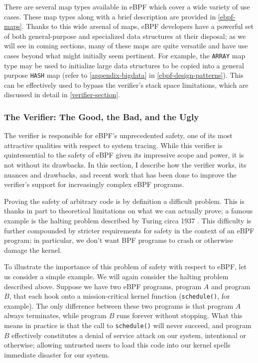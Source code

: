 \documentclass[
  12pt]{findlay}
\newcommand{\passthrough}[1]{#1}
\begin{document}
There are several map types available in eBPF which cover a wide variety
of use cases. These map types along with a brief description are
provided in \autoref{ebpf-maps}. Thanks to this wide arsenal of maps,
eBPF developers have a powerful set of both general-purpose and
specialized data structures at their disposal; as we will see in coming
sections, many of these maps are quite versatile and have use cases
beyond what might initially seem pertinent. For example, the
\passthrough{\lstinline!ARRAY!} map type may be used to initialize large
data structures to be copied into a general purpose
\passthrough{\lstinline!HASH!} map (refer to \autoref{appendix-bigdata}
in \autoref{ebpf-design-patterns}). This can be effectively used to
bypass the verifier's stack space limitations, which are discussed in
detail in \autoref{verifier-section}.

\hypertarget{the-verifier-the-good-the-bad-and-the-ugly}{%
\subsubsection{The Verifier: The Good, the Bad, and the
Ugly}\label{the-verifier-the-good-the-bad-and-the-ugly}}

\label{verifier-section}

The verifier is responsible for eBPF's unprecedented safety, one of its
most attractive qualities with respect to system tracing. While this
verifier is quintessential to the safety of eBPF given its impressive
scope and power, it is not without its drawbacks. In this section, I
describe how the verifier works, its nuances and drawbacks, and recent
work that has been done to improve the verifier's support for
increasingly complex eBPF programs.

Proving the safety of arbitrary code is by definition a difficult
problem. This is thanks in part to theoretical limitations on what we
can actually prove; a famous example is the halting problem described by
Turing circa 1937 \autocite{turing37}. This difficulty is further
compounded by stricter requirements for safety in the context of an eBPF
program; in particular, we don't want BPF programs to crash or otherwise
damage the kernel.

To illustrate the importance of this problem of safety with respect to
eBPF, let us consider a simple example. We will again consider the
halting problem described above. Suppose we have two eBPF programs,
program \(A\) and program \(B\), that each hook onto a mission-critical
kernel function (\passthrough{\lstinline!schedule()!}, for example). The
only difference between these two programs is that program \(A\) always
terminates, while program \(B\) runs forever without stopping. What this
means in practice is that the call to
\passthrough{\lstinline!schedule()!} will never succeed, and program
\(B\) effectively constitutes a denial of service attack
\autocite{hussain03} on our system, intentional or otherwise; allowing
untrusted users to load this code into our kernel spells immediate
disaster for our system.
\end{document}
